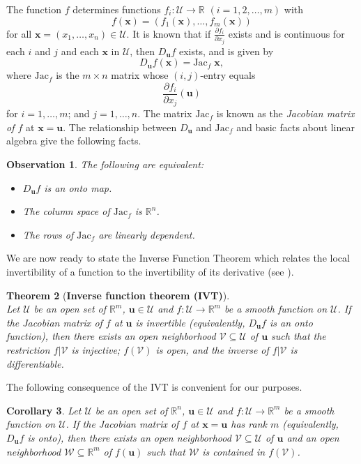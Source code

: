 \documentclass[preprint,12pt]{elsarticle}
\newtheorem{theorem}{Theorem}[section]
\newtheorem{corollary}[theorem]{Corollary}
\newtheorem{observation}[theorem]{Observation}
\begin{document}
The function $f$ determines functions 
$f_i\colon \mathcal{U} \rightarrow \mathbb{R}$ $(i=1,2, \ldots, m)$ 
with 
\[ f(\mathbf x)=(f_1(\mathbf x), \ldots, f_m(\mathbf x))\]
for all $\mathbf x=(x_1, \ldots, x_n)\in \mathcal{U}$. 
It is known that if  $\frac{\partial{f_i}}{\partial x_j}$ exists and is continuous for each $i$ and $j$ and each $\mathbf x$ in $\mathcal{U}$, then 
$D_{\mathbf u}f$ exists, and is given by 
\[ 
D_{\mathbf u}f (\mathbf  x) = \mbox{Jac}_f\;{\mathbf x}, \]
where $\mbox{Jac}_f$ is the $m\times n$ matrix whose $(i,j)$-entry equals
\[ 
\frac{\partial{f_i}}{\partial x_j} (\mathbf u)
\]
for $i=1,\ldots, m$; and $j=1,\ldots, n$.
The matrix $\mbox{Jac}_f$ is known as the {\it Jacobian matrix of $f$} at $\mathbf x= \mathbf u$.
The relationship between $D_{\mathbf u}$ and $\mbox{Jac}_f$ and basic facts about linear algebra give the following facts. 
\begin{observation}
The following are equivalent:
\begin{itemize}
\item[\rm (a)] $D_{\mathbf u} f$ is an onto map.
\item[\rm (b)] The column space of $\mbox{Jac}_f$ is  $\mathbb{R}^n$.
\item[\rm (c)] The rows of $\mbox{Jac}_f$ are linearly dependent. 
\end{itemize}
\end{observation}

We are now ready to state the Inverse Function Theorem which relates the 
local invertibility of a function to the invertibility of its derivative (see \cite{krantz2013}).  

\begin{theorem}[\bf Inverse function theorem (IVT)] 
\label{IVT}
\phantom{} \\
Let $\mathcal{U}$ be an open set of $\mathbb{R}^m$,  $\mathbf u \in \mathcal{U}$
and  $f\colon \mathcal{U} \rightarrow \mathbb{R}^m$ be a smooth function on $\mathcal{U}$.  If the Jacobian matrix of $f$ at $\mathbf u$ is invertible
(equivalently, $D_{\mathbf u}f$ is an onto function),  then there exists an open neighborhood $\mathcal{V} \subseteq \mathcal{U}$
of $\mathbf u$ such that the restriction $f|{\mathcal{V}}$ is injective; $f(
\mathcal{V})$
is open, and the inverse of $f|\mathcal{V}$ is differentiable. \end{theorem}

The following consequence of the IVT  is convenient for our purposes.

\begin{corollary}
\label{cor3}
Let $\mathcal{U}$ be an open set of $\mathbb{R}^n$, $\mathbf u\in \mathcal{U}$ and 
$f\colon \mathcal{U} \rightarrow \mathbb{R}^m$ be a smooth function on $\mathcal{U}$.
If the Jacobian matrix of $f$ at $\mathbf x=\mathbf u$ 
has rank $m$ (equivalently, $D_{\mathbf u}f$ is onto),  then there exists an open neighborhood 
 $\mathcal{V} \subseteq \mathcal{U}$ of $\mathbf u$ and an open neighborhood $\mathcal{W}\subseteq \mathbb{R}^m$ of $f(\mathbf u)$
such that $\mathcal{W}$ is contained in $f(\mathcal{V})$.
\end{corollary}
\end{document}
